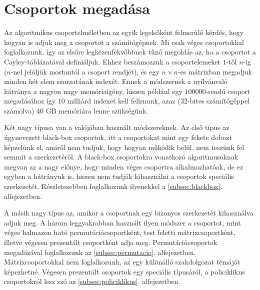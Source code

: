 \section{Csoportok megadása}
\label{sec:csoport}
Az algoritmikus csoportelméletben az egyik legelsőként felmerülő kérdés, hogy hogyan is adjuk meg
a csoportot a számítógépnek.
Mi csak véges csoportokkal foglalkozunk, így az elsőre legkézenfekvőbbnek tűnő megoldás az, ha a
csoportot a Cayley-táblázatával definiáljuk.
Ehhez beszámozzuk a csoportelemeket $1$-től $n$-ig ($n$-nel jelöljük mostantól a csoport rendjét),
és egy $n\times n$-es mátrixban megadjuk minden két elem szorzatának indexét.
Ennek a módszernek a nyílvánvaló hátránya a nagyon nagy memóriaigény,
hiszen például egy $100000$-rendű csoport megadásához így $10$ milliárd indexet kell felírnunk,
azaz (32-bites számítógéppel számolva) 40 GB memóriára lenne szükségünk.

Két nagy típusa van a valójában használt módszereknek.
Az első típus az úgynevezett black-box csoportok, itt a csoportokat mint egy fekete dobozt képzelünk el,
amiről nem tudjuk, hogy hogyan működik belül, nem teszünk fel semmit a szerkezetéről.
A black-box csoportokra vonatkozó algoritmusoknak megvan az a nagy előnye, hogy minden véges csoportra
alkalmazhatóak, de ez egyben a hátrányuk is, hiszen nem tudják kihasználni a csoportok speciális szerkezetét.
Részletesebben foglalkozunk ilyenekkel a \ref{subsec:blackbox}. alfejezetben.

A másik nagy típus az, amikor a csoportnak egy bizonyos szerkezetét kihasználva adjuk meg.
A három leggyakrabban használt ilyen módszer a csoportot, mint véges halmazon ható permutációcsoportként,
test feletti mátrixcsoportként, illetve végesen prezentált csoportként adja meg.
Permutációcsoportok megadásával foglalkozunk az \ref{subsec:permutacio}. alfejezetben.
Mátrixcsoportokkal nem foglalkozunk, az egy különálló szakdolgozat témáját képezhetné.
Végesen prezentált csoportok egy speciális típusáról, a policiklikus csoportokról lesz szó
az \ref{subsec:policiklikus}. alfejezetben.




\clearpage
